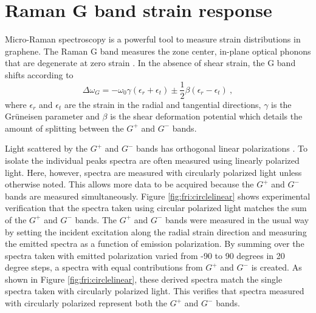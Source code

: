 \section{Raman G band strain response\label{sec:fri:Raman}}
Micro-Raman spectroscopy is a powerful tool to measure strain distributions in graph\-ene.
The Raman G band measures the zone center, in-plane optical phonons that are degenerate at zero strain \cite{Tuinstra1970,Ferrari2006}.
In the absence of shear strain, the G band shifts according to \cite{Huang2009}
\begin{equation}
	\Delta \omega_G=-\omega_0 \gamma(\epsilon_{r}+\epsilon_{t}) \pm \frac{1}{2} \beta (\epsilon_{r}-\epsilon_{t}) \ ,
\end{equation}
where $\epsilon_{r}$ and $\epsilon_{t}$ are the strain in the radial and tangential directions,  $\gamma$ is the Gr\"{u}neisen parameter and $\beta$ is the shear deformation potential which details the amount of splitting between the $G^+$ and $G^-$ bands.

Light scattered by the $G^+$ and $G^-$  bands has orthogonal linear polarizations \cite{Huang2009}.
To isolate the individual peaks spectra are often measured using linearly polarized light.
Here, however, spectra are measured with circularly polarized light unless otherwise noted.
This allows more data to be acquired because the $G^+$ and $G^-$ bands are measured simultaneously.
Figure \ref{fig:fri:circlelinear} shows experimental verification that the spectra taken using circular polarized light matches the sum of the $G^+$ and $G^-$ bands.
The $G^+$ and $G^-$ bands were measured in the usual way by setting the incident excitation along the radial strain direction and measuring the emitted spectra as a function of emission polarization.
By summing over the spectra taken with emitted polarization varied from -90 to 90 degrees in 20 degree steps, a spectra with equal contributions from $G^+$ and $G^-$ is created.
As shown in Figure \ref{fig:fri:circlelinear}, these derived spectra match the single spectra taken with circularly polarized light. 
This verifies that spectra measured with circularly polarized represent both the $G^+$ and $G^-$ bands.

